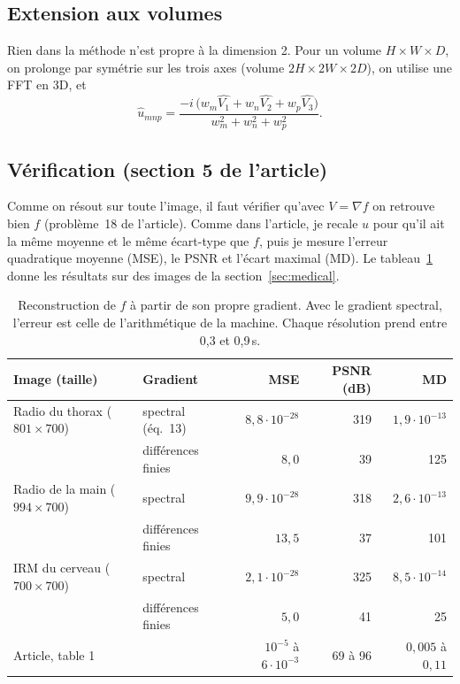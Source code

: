 \documentclass[11pt,a4paper]{article}
\newcommand{\ft}[1]{\widehat{#1}}
\begin{document}
\subsection{Extension aux volumes}

Rien dans la méthode n'est propre à la dimension 2. Pour un volume $H\times W\times D$, on prolonge par
symétrie sur les trois axes (volume $2H\times 2W\times 2D$), on utilise une FFT en 3D, et
\[
  \ft u_{mnp} = \frac{-i\,\big(w_m \ft{V_1} + w_n \ft{V_2} + w_p \ft{V_3}\big)}{w_m^2 + w_n^2 + w_p^2}.
\]

\subsection{Vérification (section 5 de l'article)}

Comme on résout sur toute l'image, il faut vérifier qu'avec $V=\nabla f$ on retrouve bien $f$
(problème~18 de l'article). Comme dans l'article, je recale $u$ pour qu'il ait la même moyenne et le même
écart-type que $f$, puis je mesure l'erreur quadratique moyenne (MSE), le PSNR et l'écart maximal (MD).
Le tableau~\ref{tab:valid} donne les résultats sur des images de la section~\ref{sec:medical}.

\begin{table}[H]
\centering\small
\begin{tabular}{@{}llrrr@{}}
\toprule
Image (taille) & Gradient & MSE & PSNR (dB) & MD \\
\midrule
Radio du thorax ($801\times700$) & spectral (éq.~13) & $8{,}8\cdot10^{-28}$ & 319 & $1{,}9\cdot10^{-13}$ \\
                                 & différences finies & $8{,}0$ & 39 & 125 \\
Radio de la main ($994\times700$) & spectral & $9{,}9\cdot10^{-28}$ & 318 & $2{,}6\cdot10^{-13}$ \\
                                  & différences finies & $13{,}5$ & 37 & 101 \\
IRM du cerveau ($700\times700$) & spectral & $2{,}1\cdot10^{-28}$ & 325 & $8{,}5\cdot10^{-14}$ \\
                                & différences finies & $5{,}0$ & 41 & 25 \\
\midrule
Article, table 1 & & $10^{-5}$ à $6\cdot10^{-3}$ & 69 à 96 & $0{,}005$ à $0{,}11$\\
\bottomrule
\end{tabular}
\caption{Reconstruction de $f$ à partir de son propre gradient. Avec le gradient spectral, l'erreur est
celle de l'arithmétique de la machine. Chaque résolution prend entre 0,3 et 0,9\,s.}
\label{tab:valid}
\end{table}
\end{document}
